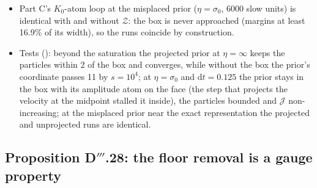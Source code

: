 \begin{itemize}
    $9.3\cdot10^{-7}$ of the face minimiser's.
  \item Part C's $K_0$-atom loop at the misplaced prior ($\eta=\sigma_0$, 6000 slow units) is identical with and
    without $\mathcal{Z}$: the box is never approached (margins at least 16.9\% of its width), so the runs coincide by
    construction.
  \item Tests (): beyond the saturation the projected prior at $\eta=\infty$ keeps
    the particles within 2 of the box and converges, while without the box the prior's coordinate passes 11 by
    $s=10^4$; at $\eta=\sigma_0$ and $\mathrm{d}t=0.125$ the prior stays in the box with its amplitude atom on the face
    (the step that projects the velocity at the midpoint stalled it inside), the particles bounded and $\mathcal{J}$
    non-increasing; at the misplaced prior near the exact representation the projected and unprojected runs are
    identical.
\end{itemize}

\subsection{Proposition D\texorpdfstring{$'''$}{'''}.28: the floor removal is a gauge property}

